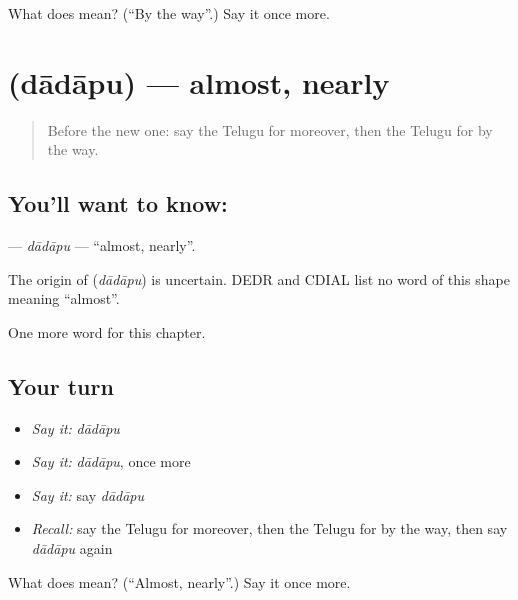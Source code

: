 \begin{tcolorbox}[breakable,colback=teal!4,colframe=teal!35!black,title={Before you move on}]
What does  mean? (\textquotedblleft{}By the way\textquotedblright{}.) Say it once more.
\end{tcolorbox}
\section[\texorpdfstring{\te{దాదాపు} (dādāpu)}{దాదాపు (dādāpu)}]{ (dādāpu) — almost, nearly}

\label{lesson:TE-C294-dadapu}



\begin{quote}
Before the new one: say the Telugu for moreover, then the Telugu for by the way.
\end{quote}

\subsection*{You'll want to know: }
\textbf{} — \emph{dādāpu} — \textquotedblleft{}almost, nearly\textquotedblright{}.

\begin{cousinweb}
The origin of \textbf{} (\emph{dādāpu}) is uncertain. DEDR and CDIAL list no word of this shape meaning \textquotedblleft{}almost\textquotedblright{}.
\end{cousinweb}

\begin{grammarlens}[title={What you've built}]
One more word for this chapter.
\end{grammarlens}

\subsection*{Your turn}
\begin{itemize}
\raggedright
  \item \emph{Say it:} \emph{dādāpu}
  \item \emph{Say it:} \emph{dādāpu}, once more
  \item \emph{Say it:} say \emph{dādāpu}
  \item \emph{Recall:} say the Telugu for moreover, then the Telugu for by the way, then say \emph{dādāpu} again
\end{itemize}

\begin{tcolorbox}[breakable,colback=teal!4,colframe=teal!35!black,title={Before you move on}]
What does  mean? (\textquotedblleft{}Almost, nearly\textquotedblright{}.) Say it once more.
\end{tcolorbox}
